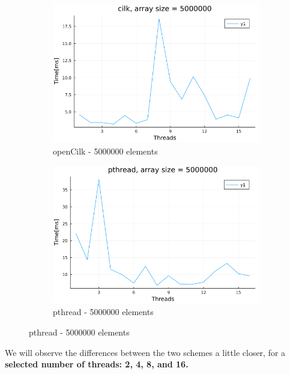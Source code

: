 \documentclass[11pt,a4paper,onecolumn,final]{article}
\begin{document}
\begin{figure}
    \begin{subfigure}{.5\textwidth}
        \centering
        \includegraphics[width=.9\linewidth]{../data/image/method/cilk_5000000.png}
        \caption{openCilk - 5000000 elements}
    \end{subfigure}%
    \begin{subfigure}{.5\textwidth}
        \centering
        \includegraphics[width=.9\linewidth]{../data/image/method/pthread_5000000.png}
        \caption{pthread - 5000000 elements}
    \end{subfigure}
\end{figure}

We will observe the differences between the two schemes a little closer, for a \textbf{selected number of threads: 2, 4, 8, and 16.} 
\end{document}
